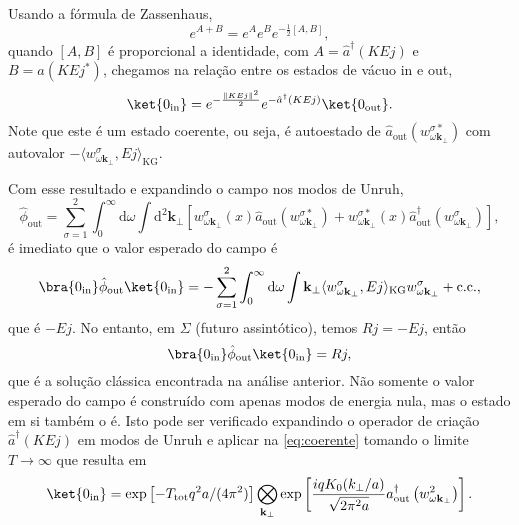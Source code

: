 \documentclass[12pt]{article}
\newcommand{\dd}{\mathrm{d}}
\newcommand{\innerkg}[2]{\langle#1,#2\rangle_{\text{KG}}}
\newcommand{\Ttot}{T_{\text{tot}}}
\newcommand{\wv}[1]{w^2_{#1\mathbf{k}_\perp}}
\newcommand{\wsig}[1]{w^{\sigma}_{#1\mathbf{k}_\perp}}
\begin{document}
Usando a fórmula de Zassenhaus, 
\begin{equation}
    e^{A+B}=e^{A}e^{B}e^{-\frac{1}{2}[A,B]},
\end{equation}
quando \([A,B]\) é proporcional a identidade, com \(A=\hat{a}^{\dagger}\left(KEj\right)\) e \(B=\hat{a}\left(KEj^*\right)\), chegamos na relação entre os estados de vácuo in e out,
\begin{equation}
    \ket{0_{\text{in}}}=e^{-\frac{\lVert KEj\rVert^2}{2}}e^{-\hat{a}^{\dagger}\left(KEj\right)}\ket{0_{\text{out}}}.
    \label{eq:coerente}
\end{equation}
Note que este é um estado coerente, ou seja, é autoestado de \(\hat{a}_{\text{out}}\left(w^{\sigma*}_{\omega\mathbf{k}_\perp}\right)\) com autovalor \(-\innerkg{\wsig{\omega}}{Ej}\).

Com esse resultado e expandindo o campo nos modos de Unruh, 
\begin{equation}
    \hat{\phi}_{\text{out}}=\sum_{\sigma=1}^2\int_{0}^{\infty}\dd\omega\int\dd^2\mathbf{k}_\perp\left[\wsig{\omega}(x)\hat{a}_{\text{out}}\left(w^{\sigma*}_{\omega\mathbf{k}_\perp}\right)+w^{\sigma*}_{\omega\mathbf{k}_\perp}(x)\hat{a}^{\dagger}_{\text{out}}\left(\wsig{\omega}\right)\right],
\end{equation}
é imediato que o valor esperado do campo é
\begin{equation}
    \bra{0_{\text{in}}}\hat{\phi}_{\text{out}}\ket{0_\text{in}}=-\sum_{\sigma=1}^2\int_0^{\infty}\dd\omega\int\mathbf{k}_\perp\innerkg{\wsig{\omega}}{Ej}\wsig{\omega}+\text{c.c.},
\end{equation}
que é \(-Ej\). No entanto, em \(\Sigma\) (futuro assintótico), temos \(Rj=-Ej\), então
\begin{equation}
    \bra{0_{\text{in}}}\hat{\phi}_{\text{out}}\ket{0_\text{in}}=Rj,
\end{equation}
que é a solução clássica encontrada na análise anterior. Não somente o valor esperado do campo é construído com apenas modos de energia nula, mas o estado em si também o é. Isto pode ser verificado expandindo o operador de criação \(\hat{a}^\dagger(KEj)\) em modos de Unruh e aplicar na \cref{eq:coerente} tomando o limite \(T\to\infty\) que resulta em
\begin{equation}
    \ket{0_{\text{in}}}=\exp\left[-\Ttot q^2a/(4\pi^2)\right]\bigotimes_{\mathbf{k}_\perp}\exp\left[\frac{iqK_0(k_\perp/a)}{\sqrt{2\pi^2a}}a^{\dagger}_{\text{out}}\left(\wv{\omega}\right)\right].
\end{equation}
\end{document}
